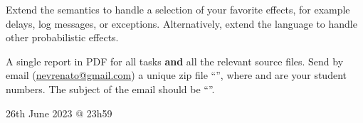 \documentclass[11pt]{article}
\theoremstyle{myplain}
\theoremstyle{definition} %
\begin{document}
 Extend the semantics to handle a
selection of your favorite effects, for example delays, log messages, or
exceptions. Alternatively, extend the language to handle other probabilistic
effects.

\bigskip

\begin{mdframed}  
   A single report in PDF for all tasks 
  \textbf{and} all the relevant source files. 
  Send by email
  (\underline{nevrenato@gmail.com}) a unique zip file
  ``'', where  and  are your
  student numbers. The subject of the email should be ``''.

 26th June 2023 @ 23h59
\end{mdframed}
\end{document}
